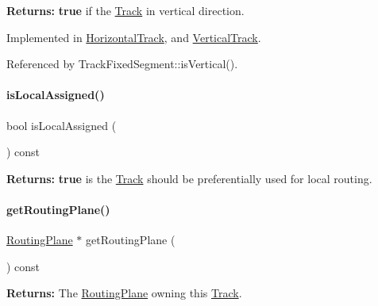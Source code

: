 {\bfseries Returns\+:} {\bfseries true} if the \mbox{\hyperlink{classKite_1_1Track}{Track}} in vertical direction. 

Implemented in \mbox{\hyperlink{classKite_1_1HorizontalTrack_abd54544ef1710ee4b67cfb021d73446c}{Horizontal\+Track}}, and \mbox{\hyperlink{classKite_1_1VerticalTrack_abd54544ef1710ee4b67cfb021d73446c}{Vertical\+Track}}.



Referenced by Track\+Fixed\+Segment\+::is\+Vertical().

\mbox{\label{classKite_1_1Track_a6835a410623b90e8abec4c7a4e0905b3}} 
\paragraph{\texorpdfstring{is\+Local\+Assigned()}{isLocalAssigned()}}
{\footnotesize\ttfamily bool is\+Local\+Assigned (\begin{DoxyParamCaption}{ }\end{DoxyParamCaption}) const\hspace{0.3cm}{\ttfamily [inline]}}

{\bfseries Returns\+:} {\bfseries true} is the \mbox{\hyperlink{classKite_1_1Track}{Track}} should be preferentially used for local routing. \mbox{\label{classKite_1_1Track_a056650e788f5235d0c4cc49e870f29b4}} 
\paragraph{\texorpdfstring{get\+Routing\+Plane()}{getRoutingPlane()}}
{\footnotesize\ttfamily \mbox{\hyperlink{classKite_1_1RoutingPlane}{Routing\+Plane}} $\ast$ get\+Routing\+Plane (\begin{DoxyParamCaption}{ }\end{DoxyParamCaption}) const\hspace{0.3cm}{\ttfamily [inline]}}

{\bfseries Returns\+:} The \mbox{\hyperlink{classKite_1_1RoutingPlane}{Routing\+Plane}} owning this \mbox{\hyperlink{classKite_1_1Track}{Track}}. 

